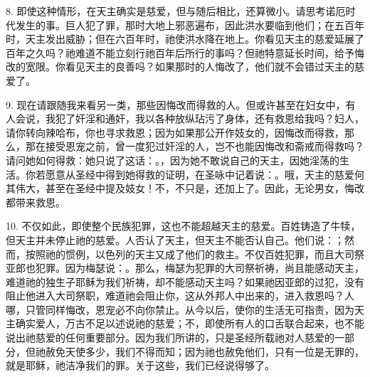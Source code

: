 8. 即使这种情形，在天主确实是慈爱，但与随后相比，还算微小。请思考诺厄时代发生的事。巨人犯了罪，那时大地上邪恶遍布，因此洪水要临到他们；在五百年时，天主发出威胁；但在六百年时，祂使洪水降在地上。你看见天主的慈爱延展了百年之久吗？祂难道不能立刻行祂百年后所行的事吗？但祂特意延长时间，给予悔改的宽限。你看见天主的良善吗？如果那时的人悔改了，他们就不会错过天主的慈爱了。\par

9. 现在请跟随我来看另一类，那些因悔改而得救的人。但或许甚至在妇女中，有人会说，我犯了奸淫和通奸，我以各种放纵玷污了身体，还有救恩给我吗？妇人，请你转向辣哈布，你也寻求救恩；因为如果那公开作妓女的，因悔改而得救，那么，那在接受恩宠之前，曾一度犯过奸淫的人，岂不也能因悔改和斋戒而得救吗？请问她如何得救：她只说了这话：。，因为她不敢说自己的天主，因她淫荡的生活。你若愿意从圣经中得到她得救的证明，在圣咏中记着说：。哦，天主的慈爱何其伟大，甚至在圣经中提及妓女！不，不只是，还加上了。因此，无论男女，悔改都带来救恩。\par

10. 不仅如此，即使整个民族犯罪，这也不能超越天主的慈爱。百姓铸造了牛犊，但天主并未停止祂的慈爱。人否认了天主，但天主不能否认自己。他们说：；然而，按照祂的惯例，以色列的天主又成了他们的救主。不仅百姓犯罪，而且大司祭亚郎也犯罪。因为梅瑟说：。那么，梅瑟为犯罪的大司祭祈祷，尚且能感动天主，难道祂的独生子耶稣为我们祈祷，却不能感动天主吗？如果祂因亚郎的过犯，没有阻止他进入大司祭职，难道祂会阻止你，这从外邦人中出来的，进入救恩吗？人哪，只管同样悔改，恩宠必不向你禁止。从今以后，使你的生活无可指责，因为天主确实爱人，万古不足以述说祂的慈爱；不，即使所有人的口舌联合起来，也不能说出祂慈爱的任何重要部分。因为我们所讲的，只是圣经所载祂对人慈爱的一部分，但祂赦免天使多少，我们不得而知；因为祂也赦免他们，只有一位是无罪的，就是耶稣，祂洁净我们的罪。关于这些，我们已经说得够了。\par

